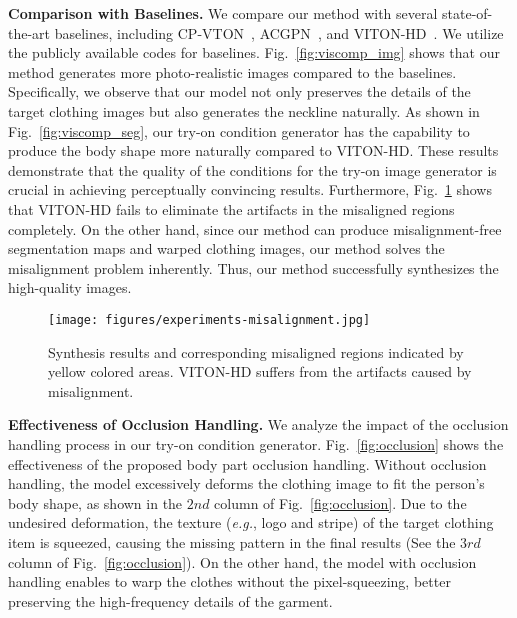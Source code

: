 \noindent\textbf{Comparison with Baselines.}
We compare our method with several state-of-the-art baselines, including CP-VTON~\cite{wang2018toward}, ACGPN~\cite{yang2020towards}, and VITON-HD~\cite{choi2021viton}.
We utilize the publicly available codes for baselines.
Fig.~\ref{fig:viscomp_img} shows that our method generates more photo-realistic images compared to the baselines.
Specifically, we observe that our model not only preserves the details of the target clothing images but also generates the neckline naturally.
As shown in Fig.~\ref{fig:viscomp_seg}, our try-on condition generator has the capability to produce the body shape more naturally compared to VITON-HD.
These results demonstrate that the quality of the conditions for the try-on image generator is crucial in achieving perceptually convincing results.
Furthermore, Fig.~\ref{fig:misalignment} shows that VITON-HD fails to eliminate the artifacts in the misaligned regions completely.
On the other hand, since our method can produce misalignment-free segmentation maps and warped clothing images, our method solves the misalignment problem inherently.
Thus, our method successfully synthesizes the high-quality images.


\begin{figure}[t!]
    \centering
    \texttt{[image: figures/experiments-misalignment.jpg]}
    \caption{Synthesis results and corresponding misaligned regions indicated by yellow colored areas. VITON-HD suffers from the artifacts caused by misalignment.}
    \label{fig:misalignment}
    \vspace{0.5cm}
\end{figure}



\noindent\textbf{Effectiveness of Occlusion Handling.}
We analyze the impact of the occlusion handling process in our try-on condition generator.
Fig.~\ref{fig:occlusion} shows the effectiveness of the proposed body part occlusion handling. 
Without occlusion handling, the model excessively deforms the clothing image to fit the person's body shape, as shown in the $2nd$ column of Fig.~\ref{fig:occlusion}.
Due to the undesired deformation, the texture (\textit{e.g.}, logo and stripe) of the target clothing item is squeezed, causing the missing pattern in the final results (See the $3rd$ column of Fig.~\ref{fig:occlusion}).
On the other hand, the model with occlusion handling enables to warp the clothes without the pixel-squeezing, better preserving the high-frequency details of the garment.


